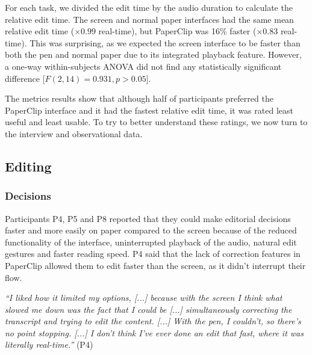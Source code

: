For each task, we divided the edit time by the audio duration to calculate the relative edit time.  The screen and
normal paper interfaces had the same mean relative edit time ($\times 0.99$ real-time), but PaperClip was 16\% faster
($\times 0.83$ real-time).  This was surprising, as we expected the screen interface to be faster than both the pen and
normal paper due to its integrated playback feature.  However, a one-way within-subjects ANOVA did not find any
statistically significant difference [$F(2,14) = 0.931, p > 0.05$].

The metrics results show that although half of participants preferred the PaperClip interface and it had the fastest
relative edit time, it was rated least useful and least usable. 
To try to better understand these ratings, we now turn to the interview and observational
data.


























\subsection{Editing}





\subsubsection{Decisions}
Participants P4, P5 and P8 reported that they could make editorial decisions faster and more easily on paper compared
to the screen because of the reduced functionality of the interface, uninterrupted playback of the audio, natural edit
gestures and faster reading speed.  P4 said that the lack of correction features in PaperClip allowed them to
edit faster than the screen, as it didn't interrupt their flow.

\textit{``I liked how it limited my options, [...]
  because with the screen I think what slowed me down
  was the fact that I could be
  [...] simultaneously correcting the transcript and trying to edit the content. [...]
  With the pen, I couldn't, so there's no point stopping. [...]
  I don't think I've ever done an edit that fast, where it was literally real-time.''} (P4)



